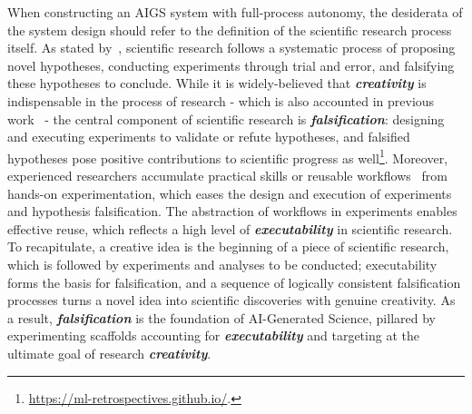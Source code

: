 \documentclass{article} %
\newcommand{\AIGSFull}{AI-Generated Science\xspace}
\newcommand{\AIGS}{AIGS\xspace}
\begin{document}
 When constructing an \AIGS system with full-process autonomy, the desiderata of the system design should refer to the definition of the scientific research process itself. As stated by~\citet{Popper1935-POPTLO-7}, scientific research follows a systematic process of proposing novel hypotheses, conducting experiments through trial and error, and falsifying these hypotheses to conclude. While it is widely-believed that \textbf{\textit{creativity}} is indispensable in the process of research - which is also accounted in previous work~\citep{si2024can} - the central component of scientific research is \textbf{\textit{falsification}}: designing and executing experiments to validate or refute hypotheses, and falsified hypotheses pose positive contributions to scientific progress as well\footnote{\url{https://ml-retrospectives.github.io/}.}. Moreover, experienced researchers accumulate practical skills or reusable workflows~\citep{scientific-workflow} from hands-on experimentation, which eases the design and execution of experiments and hypothesis falsification. The abstraction of workflows in experiments enables effective reuse, which reflects a high level of \textbf{\textit{executability}} in scientific research. To recapitulate, a creative idea is the beginning of a piece of scientific research, which is followed by experiments and analyses to be conducted; executability forms the basis for falsification, and a sequence of logically consistent falsification processes turns a novel idea into scientific discoveries with genuine creativity. As a result, \textbf{\textit{falsification}} is the foundation of \AIGSFull, pillared by experimenting scaffolds accounting for \textbf{\textit{executability}} and targeting at the ultimate goal of research \textbf{\textit{creativity}}. 
\end{document}
